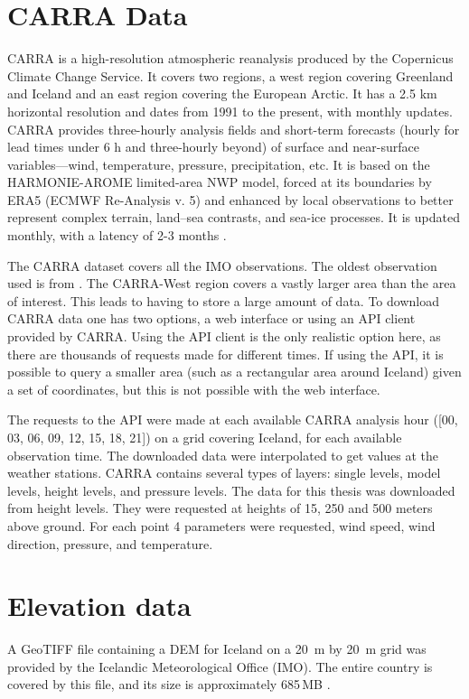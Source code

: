 \section{CARRA Data}
CARRA is a high-resolution atmospheric reanalysis produced by the Copernicus Climate Change Service. It covers two regions, a west region covering Greenland and Iceland and an east region covering the European Arctic. It has a 2.5 km horizontal resolution and dates from 1991 to the present, with monthly updates. CARRA provides three-hourly analysis fields and short-term forecasts (hourly for lead times under 6 h and three-hourly beyond) of surface and near-surface variables—wind, temperature, pressure, precipitation, etc. It is based on the HARMONIE-AROME limited-area NWP model, forced at its boundaries by ERA5 (ECMWF Re-Analysis v. 5) and enhanced by local observations to better represent complex terrain, land–sea contrasts, and sea-ice processes. It is updated monthly, with a latency of 2-3 months \cite{carra_information}.

The CARRA dataset covers all the IMO observations. The oldest observation used is from \startDateVedur. The CARRA-West region covers a vastly larger area than the area of interest. This leads to having to store a large amount of data. To download CARRA data one has two options, a web interface or using an API client provided by CARRA. Using the API client is the only realistic option here, as there are thousands of requests made for different times. If using the API, it is possible to query a smaller area (such as a rectangular area around Iceland) given a set of coordinates, but this is not possible with the web interface.

The requests to the API were made at each available CARRA analysis hour ([00, 03, 06, 09, 12, 15, 18, 21]) on a grid covering Iceland, for each available observation time. The downloaded data were interpolated to get values at the weather stations. CARRA contains several types of layers: single levels, model levels, height levels, and pressure levels. The data for this thesis was downloaded from height levels. They were requested at heights of 15, 250 and 500 meters above ground. For each point 4 parameters were requested, wind speed, wind direction, pressure, and temperature.

\section{Elevation data}
A GeoTIFF file containing a DEM for Iceland on a 20~m by 20~m grid was provided by the Icelandic Meteorological Office (IMO). The entire country is covered by this file, and its size is approximately 685\,MB \cite{ragnar_geotiff}.


